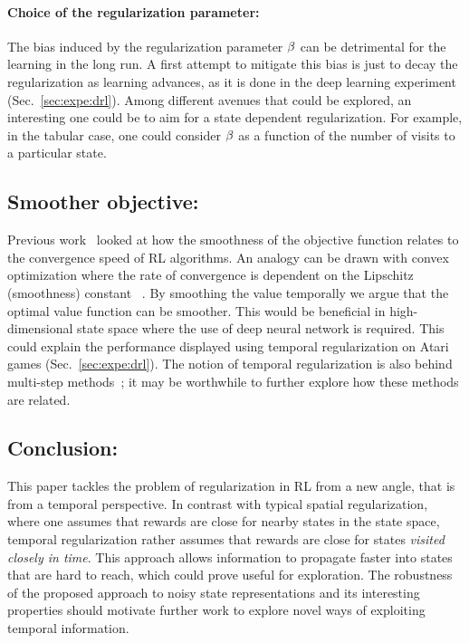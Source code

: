\paragraph{Choice of the regularization parameter:}

The bias induced by the regularization parameter $\beta$ can be detrimental for the learning in the long run. A first attempt to mitigate this bias is just to decay the regularization as learning advances, as it is done in the deep learning experiment (Sec.~\ref{sec:expe:drl}). Among different avenues that could be explored, an interesting one could be to aim for a state dependent regularization. For example, in the tabular case, one could consider $\beta$ as a function of the number of visits to a particular state.
\subsection{Smoother objective:}

Previous work~\cite{smooth_value} looked at how the smoothness of the objective function relates to the convergence speed of RL algorithms.  An analogy can be drawn with convex optimization where the rate of convergence is dependent on the Lipschitz (smoothness) constant ~\cite{boyd2004convex}. 
By smoothing the value temporally we argue that the optimal value function can be smoother. This would be beneficial in high-dimensional state space where the use of deep neural network is required. This could explain the performance displayed using temporal regularization on Atari games (Sec.~\ref{sec:expe:drl}).
The notion of temporal regularization is also behind multi-step methods~\cite{sutton1998reinforcement}; it may be worthwhile to further explore how these methods are related.

\subsection{Conclusion:}

This paper tackles the problem of regularization in RL from a new angle, that is from a temporal perspective. In contrast with typical spatial regularization, where one assumes that rewards are close for nearby states in the state space, temporal regularization rather assumes that rewards are close for states \emph{visited closely in time}. This approach allows information to propagate faster into states that are hard to reach, which could prove useful for exploration. The robustness of the proposed approach to noisy state representations and its interesting properties should motivate further work to explore novel ways of exploiting temporal information.
